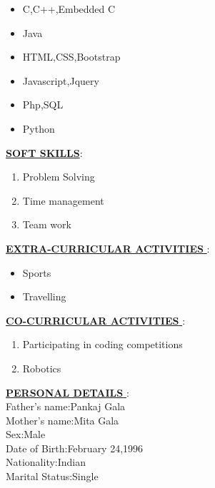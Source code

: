 \documentclass[a4paper,12pt]{article}
\begin{document}
\begin{flushleft}
\begin{itemize}
 \item{C,C++,Embedded C}
 \item{Java}
 \item{HTML,CSS,Bootstrap}
 \item{Javascript,Jquery}
 \item{Php,SQL}
 \item{Python}
\end{itemize}
\underline{\textbf{SOFT SKILLS}}:\\[0.5cm]
\begin{enumerate}
 \item{Problem Solving}
 \item{Time management}
 \item{Team work}
\end{enumerate}
\underline{\textbf{EXTRA-CURRICULAR ACTIVITIES }}:\\[0.5cm]
\begin{itemize}
 \item{Sports}
 \item{Travelling}
\end{itemize}
\underline{\textbf{CO-CURRICULAR ACTIVITIES }}:\\[0.5cm]
\begin{enumerate}
 \item{Participating in coding competitions}
 \item{Robotics}
\end{enumerate}
\underline{\textbf{PERSONAL DETAILS }}:\\[0.5cm]
Father's name:Pankaj Gala\\
Mother's name:Mita Gala\\
Sex:Male\\
Date of Birth:February 24,1996\\
Nationality:Indian\\
Marital Status:Single\\[0.5cm]


 \end{flushleft}
\end{document}
